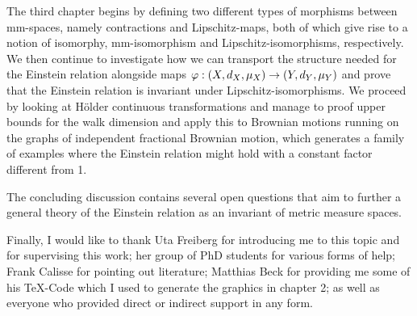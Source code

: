 The third chapter begins by defining two different types of morphisms between mm-spaces, namely contractions and Lipschitz-maps, both of which give rise to a notion of isomorphy, mm-isomorphism and Lipschitz-isomorphisms, respectively. We then continue to investigate how we can transport the structure needed for the Einstein relation alongside maps $\varphi:(X,d_X,\mu_X)\to (Y,d_Y,\mu_Y)$ and prove that the Einstein relation is invariant under Lipschitz-isomorphisms. We proceed by looking at H\"older continuous transformations and manage to proof upper bounds for the walk dimension and apply this to Brownian motions running on the graphs of independent fractional Brownian motion, which generates a family of examples where the Einstein relation might hold with a constant factor different from 1.  

The concluding discussion contains several open questions that aim to further a general theory of the Einstein relation as an invariant of metric measure spaces.

Finally, I would like to thank Uta Freiberg for introducing me to this topic and for supervising this work; her group of PhD students for various forms of help; Frank Calisse for pointing out literature; Matthias Beck for providing me some of his \TeX-Code which I used to generate the graphics in chapter 2; as well as everyone who provided direct or indirect support in any form. 
